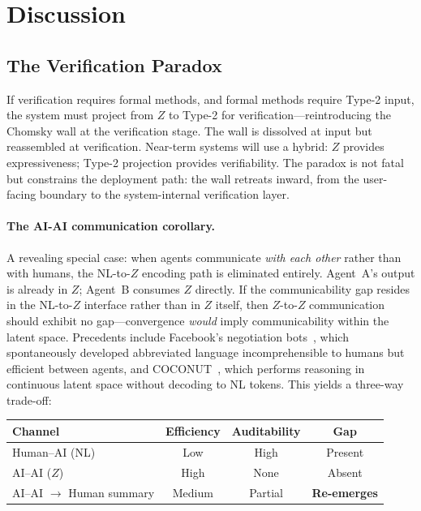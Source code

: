 \documentclass[11pt]{article}
\theoremstyle{definition}
\begin{document}

\section{Discussion}

\subsection{The Verification Paradox}\label{sec:verification}

If verification requires formal methods, and formal methods require Type-2 input, the system must project from $Z$ to Type-2 for verification---reintroducing the Chomsky wall at the verification stage. The wall is dissolved at input but reassembled at verification. Near-term systems will use a hybrid: $Z$ provides expressiveness; Type-2 projection provides verifiability. The paradox is not fatal but constrains the deployment path: the wall retreats inward, from the user-facing boundary to the system-internal verification layer.

\paragraph{The AI-AI communication corollary.}
A revealing special case: when agents communicate \emph{with each other} rather than with humans, the NL-to-$Z$ encoding path is eliminated entirely. Agent~A's output is already in $Z$; Agent~B consumes $Z$ directly. If the communicability gap resides in the NL-to-$Z$ interface rather than in $Z$ itself, then $Z$-to-$Z$ communication should exhibit no gap---convergence \emph{would} imply communicability within the latent space. Precedents include Facebook's negotiation bots~\cite{lewis2017negotiation}, which spontaneously developed abbreviated language incomprehensible to humans but efficient between agents, and COCONUT~\cite{hao2024coconut}, which performs reasoning in continuous latent space without decoding to NL tokens. This yields a three-way trade-off:

\begin{center}
\footnotesize
\begin{tabular}{@{}lccc@{}}
\toprule
\textbf{Channel} & \textbf{Efficiency} & \textbf{Auditability} & \textbf{Gap} \\
\midrule
Human--AI (NL) & Low & High & Present \\
AI--AI ($Z$) & High & None & Absent \\
AI--AI $\to$ Human summary & Medium & Partial & \textbf{Re-emerges} \\
\bottomrule
\end{tabular}
\end{center}
\end{document}
